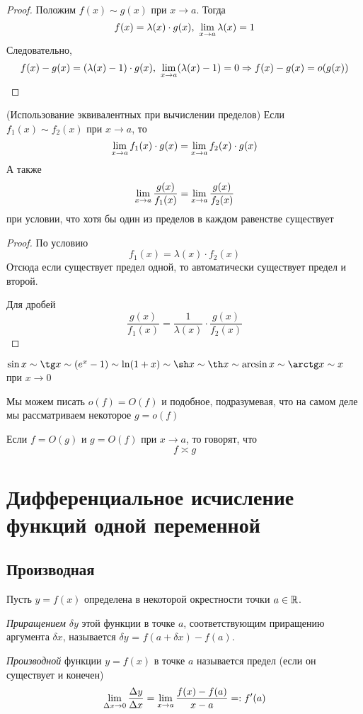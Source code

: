 \begin{proof}
	Положим $f(x) \sim g(x)$ при $x \to a$. Тогда
	$$
		f(x) = \lambda(x) \cdot g(x),\ \liml_{x \to a} \lambda(x) = 1
	$$
	Следовательно,
	$$
		f(x) - g(x) = (\lambda(x) - 1) \cdot g(x),\ \liml_{x \to a} (\lambda(x) - 1) = 0 \Ra f(x) - g(x) = o(g(x))
	$$
\end{proof}

\begin{theorem} (Использование эквивалентных при вычислении пределов)
	Если $f_1(x) \sim f_2(x)$ при $x \to a$, то
	$$
		\lim\limits_{x \to a} f_1(x) \cdot g(x) = \lim\limits_{x \to a} f_2(x) \cdot g(x)
	$$
	А также
	$$
		\lim\limits_{x \to a} \frac{g(x)}{f_1(x)} = \lim\limits_{x \to a} \frac{g(x)}{f_2(x)}
	$$
	при условии, что хотя бы один из пределов в каждом равенстве существует
\end{theorem}

\begin{proof}
	По условию
	$$
		f_1(x) = \lambda(x) \cdot f_2(x)
	$$
	Отсюда если существует предел одной, то автоматически существует предел и второй.
	
	Для дробей
	$$
		\frac{g(x)}{f_1(x)} = \frac{1}{\lambda(x)} \cdot \frac{g(x)}{f_2(x)}
	$$
\end{proof}

\begin{proposition}
	$\sin x \sim \tg x \sim (e^x - 1) \sim \ln(1 + x) \sim \sh x \sim \th x \sim \arcsin x \sim \arctg x \sim x$ при $x \to 0$
\end{proposition}

\begin{note}
	Мы можем писать $o(f) = O(f)$ и подобное, подразумевая, что на самом деле мы рассматриваем некоторое $g = o(f)$
\end{note}

\begin{definition}
	Если $f = O(g)$ и $g = O(f)$ при $x \to a$, то говорят, что
	$$
		f \asymp g
	$$
\end{definition}


\section{Дифференциальное исчисление функций одной переменной}

\subsection{Производная}

\begin{definition}
	Пусть $y = f(x)$ определена в некоторой окрестности точки $a \in \mathbb{R}$.
	
	\textit{Приращением} $\delta y$ этой функции в точке $a$, соответствующим приращению аргумента $\delta x$, называется $\delta y$ = $f(a + \delta x) - f(a)$.
	
	\textit{Производной} функции $y = f(x)$ в точке $a$ называется предел (если он существует и конечен)
	$$
		\lim\limits_{\Delta x \to 0} \frac{\Delta y}{\Delta x} = \lim\limits_{x \to a} \frac{f(x) - f(a)}{x - a} =: f'(a)
	$$
\end{definition}

